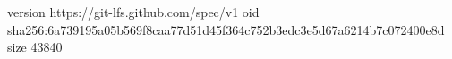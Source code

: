 version https://git-lfs.github.com/spec/v1
oid sha256:6a739195a05b569f8caa77d51d45f364c752b3edc3e5d67a6214b7c072400e8d
size 43840
